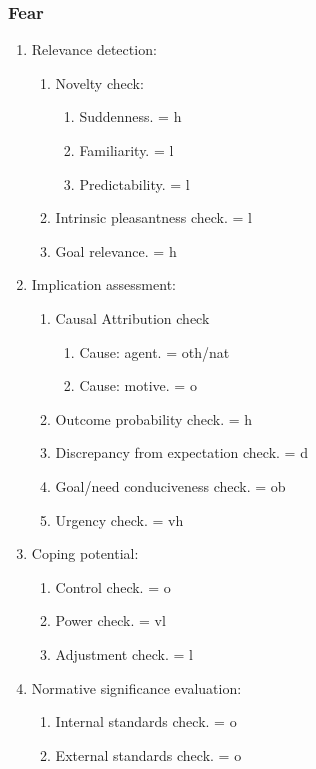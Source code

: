 \subsubsection{Fear}

\begin{enumerate}
 \item  Relevance detection:
 \begin{enumerate}
  \item  Novelty check:
  \begin{enumerate}
   \item  Suddenness. = h
   \item  Familiarity. = l
   \item  Predictability. = l
  \end{enumerate}
  \item  Intrinsic pleasantness check. = l
  \item  Goal relevance. = h
 \end{enumerate}
 \item  Implication assessment:
 \begin{enumerate}
  \item  Causal Attribution check
  \begin{enumerate}
   \item  Cause: agent. = oth/nat
   \item  Cause: motive. = o
  \end{enumerate}
  \item  Outcome probability check. = h
  \item  Discrepancy from expectation check. = d
  \item  Goal/need conduciveness check. = ob
  \item  Urgency check. = vh
 \end{enumerate}
 \item  Coping potential:
 \begin{enumerate}
  \item  Control check. = o
  \item  Power check. = vl
  \item  Adjustment check. = l
 \end{enumerate}
 \item  Normative significance evaluation:
 \begin{enumerate}
  \item  Internal standards check. = o
  \item  External standards check. = o
 \end{enumerate}
\end{enumerate}

